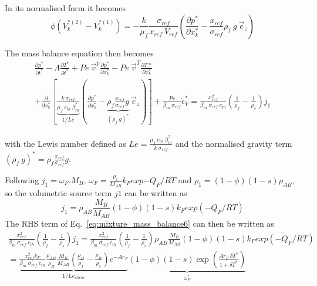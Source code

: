 \documentclass[]{scrreprt}
\begin{document}
In its normalised form it becomes 
\begin{equation}
  \label{eq:darcy_normalised}
  \phi(V^{*(2)}_k -V^{*(1)}_k)
  = -\frac{k}{\mu_f} \frac{\sigma_{ref}}{x_{ref}\:V_{ref}}\left(\frac{\partial p^*}{\partial x^*_k} - \frac{x_{ref}}{\sigma_{ref}}\rho_f\:g\:\vec{e}_z \right)
\end{equation}

The mass balance equation then becomes
\begin{multline}
  \label{eq:mixture_mass_balance6}
  \frac{\partial p^*}{\partial t^*} 
  - \Lambda \frac{\partial T^*}{\partial t^*} 
  + Pe \:\vec{v}^p \frac{\partial p^*}{\partial x^*_k} 
  - Pe \:\vec{v}^T \frac{\partial T*}{\partial x^*_k} \\
  + \frac{\partial}{\partial x^*_k} \left[ \underbrace{\frac{k \: \sigma_{ref}}{\mu_f\:c_{th}\:\beta^*_m}}_{1/Le} \left( \frac{\partial p^*}{\partial x^*_k} - \underbrace{\rho_f \frac{x_{ref}}{\sigma_{ref}}g}_{(\rho_f\:g)^*}\: \vec{e}_z  \right) \right]
  + \frac{Pe}{\beta_m\:\sigma_{ref}} \dot{\epsilon}^*_V  
  = \frac{x^2_{ref}}{\beta_m\:\sigma_{ref}\:c_{th}} \left(\frac{1}{\rho_f} - \frac{1}{\rho_s}\right)j_1
\end{multline}

with the Lewis number defined as $Le = \frac{\mu_f\:c_{th}\:\beta^*_m}{k \: \sigma_{ref}}$ and the normalised gravity term $(\rho_f\:g)^*=\rho_f \frac{x_{ref}}{\sigma_{ref}}g$.

Following \citep[][appendix A]{Alevizos2014}
$j_1 = \omega_F.M_B$, $\omega_F=\frac{\rho_1}{M_{AB}}k_F exp{-Q_F/RT}$ and $\rho_1=(1-\phi)(1-s)\rho_{AB}$, so the volumetric source term $j1$ can be written as
\begin{equation}
  \label{eq:j1_a}
  j_1 =\rho_{AB}\frac{M_B}{M_{AB}}(1-\phi)(1-s) k_F exp{(-Q_F/RT)}
\end{equation}
The RHS term of Eq.~\ref{eq:mixture_mass_balance6} can then be written as
\begin{multline}
  \label{eq:mixture_mass_balance_rhs}
  \frac{x^2_{ref}}{\beta_m\:\sigma_{ref}\:c_{th}} \left(\frac{1}{\rho_f} - \frac{1}{\rho_s}\right)j_1 = \frac{x^2_{ref}}{\beta_m\:\sigma_{ref}\:c_{th}} \left(\frac{1}{\rho_f} - \frac{1}{\rho_s}\right)\rho_{AB}\frac{M_B}{M_{AB}}(1-\phi)(1-s) k_F exp{(-Q_F/RT)} \\
  = \underbrace{\frac{x^2_{ref}k_F }{\beta_m\:\sigma_{ref}\:c_{th}} \frac{\rho_{AB}}{\rho_B}\frac{M_B}{M_{AB}}\left(\frac{\rho_B}{\rho_f} - \frac{\rho_B}{\rho_s}\right)e^{-Ar_F}}_{1/Le_{chem}} \underbrace{(1-\phi)(1-s) \exp{\left( \frac{Ar_F \:\delta T^*}{1+\delta T^*} \right)}}_{\omega^*_F }
\end{multline}
\end{document}
